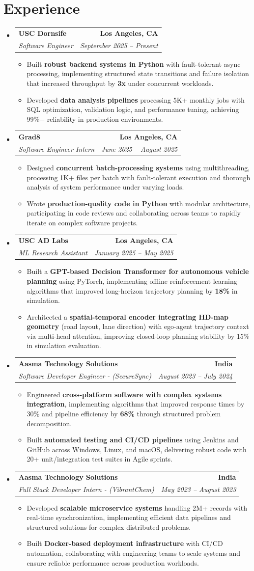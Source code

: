\documentclass[letterpaper,10pt]{article}
\makeatletter
\newcommand{\resumeItem}[1]{\item\small{{#1 \vspace{-2pt}}}}
\newcommand{\resumeSubheading}[4]{\vspace{-1pt}\item\begin{tabular*}{1.0\textwidth}[t]{l@{\extracolsep{\fill}}r}\textbf{#1} & \textbf{\small #2} \\\textit{\small#3} & \textit{\small #4} \\\end{tabular*}\vspace{-2pt}}
\newcommand{\resumeSubHeadingListStart}{\begin{itemize}[leftmargin=0.0in, label={}]}
\newcommand{\resumeSubHeadingListEnd}{\end{itemize}}
\newcommand{\resumeItemListStart}{\begin{itemize}[leftmargin=0.15in,label=\textbullet,itemsep=2pt,topsep=0pt,parsep=0pt,partopsep=0pt]}
\newcommand{\resumeItemListEnd}{\end{itemize}\vspace{-4pt}}
\makeatother
\begin{document}
\section{Experience}
\resumeSubHeadingListStart
\resumeSubheading{USC Dornsife}{Los Angeles, CA}{Software Engineer}{September 2025 -- Present}
\resumeItemListStart
\resumeItem{Built \textbf{robust backend systems in Python} with fault-tolerant async processing, implementing structured state transitions and failure isolation that increased throughput by \textbf{3x} under concurrent workloads.}
\resumeItem{Developed \textbf{data analysis pipelines} processing 5K+ monthly jobs with SQL optimization, validation logic, and performance tuning, achieving 99\%+ reliability in production environments.}
\resumeItemListEnd
\resumeSubheading{Grad8}{Los Angeles, CA}{Software Engineer Intern}{June 2025 -- August 2025}
\resumeItemListStart
\resumeItem{Designed \textbf{concurrent batch-processing systems} using multithreading, processing 1K+ files per batch with fault-tolerant execution and thorough analysis of system performance under varying loads.}
\resumeItem{Wrote \textbf{production-quality code in Python} with modular architecture, participating in code reviews and collaborating across teams to rapidly iterate on complex software projects.}
\resumeItemListEnd
\resumeSubheading{USC AD Labs}{Los Angeles, CA}{ML Research Assistant}{January 2025 -- May 2025}
\resumeItemListStart
\resumeItem{Built a \textbf{GPT-based Decision Transformer for autonomous vehicle planning} using PyTorch, implementing offline reinforcement learning algorithms that improved long-horizon trajectory planning by \textbf{18\%} in simulation.}
\resumeItem{Architected a \textbf{spatial-temporal encoder integrating HD-map geometry} (road layout, lane direction) with ego-agent trajectory context via multi-head attention, improving closed-loop planning stability by 15\% in simulation evaluation.}
\resumeItemListEnd
\resumeSubheading{Aasma Technology Solutions}{India}{Software Developer Engineer - (SecureSync)}{August 2023 -- July 2024}
\resumeItemListStart
\resumeItem{Engineered \textbf{cross-platform software with complex systems integration}, implementing algorithms that improved response times by 30\% and pipeline efficiency by \textbf{68\%} through structured problem decomposition.}
\resumeItem{Built \textbf{automated testing and CI/CD pipelines} using Jenkins and GitHub across Windows, Linux, and macOS, delivering robust code with 20+ unit/integration test suites in Agile sprints.}
\resumeItemListEnd
\resumeSubheading{Aasma Technology Solutions}{India}{Full Stack Developer Intern - (VibrantChem)}{May 2023 -- August 2023}
\resumeItemListStart
\resumeItem{Developed \textbf{scalable microservice systems} handling 2M+ records with real-time synchronization, implementing efficient data pipelines and structured solutions for complex distributed problems.}
\resumeItem{Built \textbf{Docker-based deployment infrastructure} with CI/CD automation, collaborating with engineering teams to scale systems and ensure reliable performance across production workloads.}
\resumeItemListEnd
\resumeSubHeadingListEnd
\vspace{-14pt}
\end{document}
